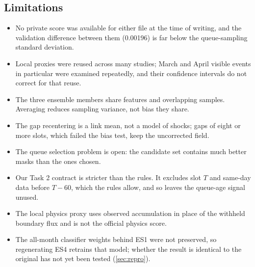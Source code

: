 \subsection{Limitations}
\begin{itemize}
  \item No private score was available for either file at the time of writing, and the validation difference between
        them (0.00196) is far below the queue-sampling standard deviation.
  \item Local proxies were reused across many studies; March and April visible events in particular were examined
        repeatedly, and their confidence intervals do not correct for that reuse.
  \item The three ensemble members share features and overlapping samples. Averaging reduces sampling variance, not
        bias they share.
  \item The gap recentering is a link mean, not a model of shocks; gaps of eight or more slots, which failed the bias
        test, keep the uncorrected field.
  \item The queue selection problem is open: the candidate set contains much better masks than the ones chosen.
  \item Our Task 2 contract is stricter than the rules. It excludes slot $T$ and same-day data before $T{-}60$, which the
        rules allow, and so leaves the queue-age signal unused.
  \item The local physics proxy uses observed accumulation in place of the withheld boundary flux and is not the
        official physics score.
  \item The all-month classifier weights behind ES1 were not preserved, so regenerating ES4 retrains that model; whether
        the result is identical to the original has not yet been tested (\cref{sec:repro}).
\end{itemize}

